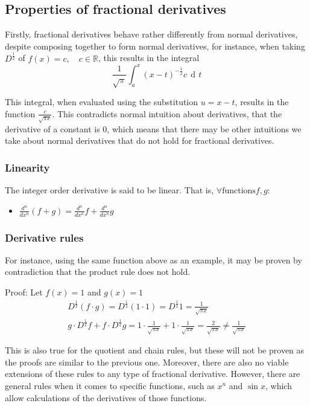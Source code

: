 \documentclass{article}
\DeclareMathOperator{\di}{\,d\!}
\begin{document}
\subsection{Properties of fractional derivatives}

Firstly, fractional derivatives behave rather differently from normal
derivatives, despite composing together to form normal derivatives, for
instance, when taking $D^\frac{1}{2}$ of $f(x)=c, \quad c \in \mathbb{R}$, this
results in the integral
$$
\frac{1}{\sqrt{\pi}} \int_a^x \left(x-t\right)^{-\frac{1}{2}} c \di t
$$

This integral, when evaluated using the substitution $u=x-t$, results in the
function $\frac{c}{\sqrt{\pi x}}$. This contradicts normal intuition about
derivatives, that the derivative of a constant is $0$, which means that there
may be other intuitions we take about normal derivatives that do not hold for
fractional derivatives.

\subsubsection{Linearity}

The integer order derivative is said to be linear. That is, $\forall \text{functions} f,g$:
\begin{itemize}
	\item{$\frac{d^n}{dx^n} \left(f + g\right) = \frac{d^n}{dx^n} f + \frac{d^n}{dx^n} g$}
\end{itemize}

\subsubsection{Derivative rules}

For instance, using the same function above as an example, it may be proven by
contradiction that the product rule does not hold.

Proof: Let $f(x) = 1$ and $g(x) = 1$
\begin{gather*}
	D^\frac{1}{2} \left(f \cdot g\right) = D^\frac{1}{2} \left(1 \cdot 1\right) = D^\frac{1}{2} 1 = \frac{1}{\sqrt{\pi x}} \\
	g \cdot D^\frac{1}{2} f + f \cdot D^\frac{1}{2} g = 1 \cdot \frac{1}{\sqrt{\pi x}} + 1 \cdot \frac{1}{\sqrt{\pi x}} = \frac{2}{\sqrt{\pi x}} \neq \frac{1}{\sqrt{\pi x}}
\end{gather*}

This is also true for the quotient and chain rules, but these will not be
proven as the proofs are similar to the previous one. Moreover, there are also
no viable extensions of these rules to any type of fractional
derivative. However, there are general rules when it comes to specific
functions, such as $x^n$ and $\sin x$, which allow calculations of the
derivatives of those functions.
\end{document}
